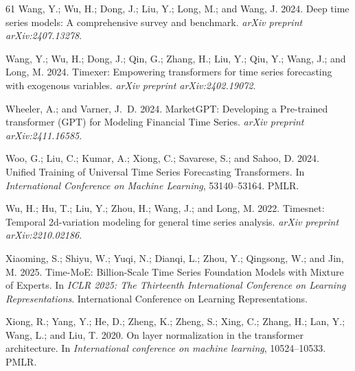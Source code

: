 \documentclass[letterpaper]{article} %
\begin{document}
\begin{thebibliography}{61}
Wang, Y.; Wu, H.; Dong, J.; Liu, Y.; Long, M.; and Wang, J. 2024{}.
\newblock Deep time series models: A comprehensive survey and benchmark.
\newblock \emph{arXiv preprint arXiv:2407.13278}.

Wang, Y.; Wu, H.; Dong, J.; Qin, G.; Zhang, H.; Liu, Y.; Qiu, Y.; Wang, J.; and
  Long, M. 2024{}.
\newblock Timexer: Empowering transformers for time series forecasting with
  exogenous variables.
\newblock \emph{arXiv preprint arXiv:2402.19072}.

Wheeler, A.; and Varner, J.~D. 2024.
\newblock MarketGPT: Developing a Pre-trained transformer (GPT) for Modeling
  Financial Time Series.
\newblock \emph{arXiv preprint arXiv:2411.16585}.

Woo, G.; Liu, C.; Kumar, A.; Xiong, C.; Savarese, S.; and Sahoo, D. 2024.
\newblock Unified Training of Universal Time Series Forecasting Transformers.
\newblock In \emph{International Conference on Machine Learning}, 53140--53164.
  PMLR.

Wu, H.; Hu, T.; Liu, Y.; Zhou, H.; Wang, J.; and Long, M. 2022.
\newblock Timesnet: Temporal 2d-variation modeling for general time series
  analysis.
\newblock \emph{arXiv preprint arXiv:2210.02186}.

Xiaoming, S.; Shiyu, W.; Yuqi, N.; Dianqi, L.; Zhou, Y.; Qingsong, W.; and Jin,
  M. 2025.
\newblock Time-MoE: Billion-Scale Time Series Foundation Models with Mixture of
  Experts.
\newblock In \emph{ICLR 2025: The Thirteenth International Conference on
  Learning Representations}. International Conference on Learning
  Representations.

Xiong, R.; Yang, Y.; He, D.; Zheng, K.; Zheng, S.; Xing, C.; Zhang, H.; Lan,
  Y.; Wang, L.; and Liu, T. 2020.
\newblock On layer normalization in the transformer architecture.
\newblock In \emph{International conference on machine learning}, 10524--10533.
  PMLR.


\end{thebibliography}
\end{document}
